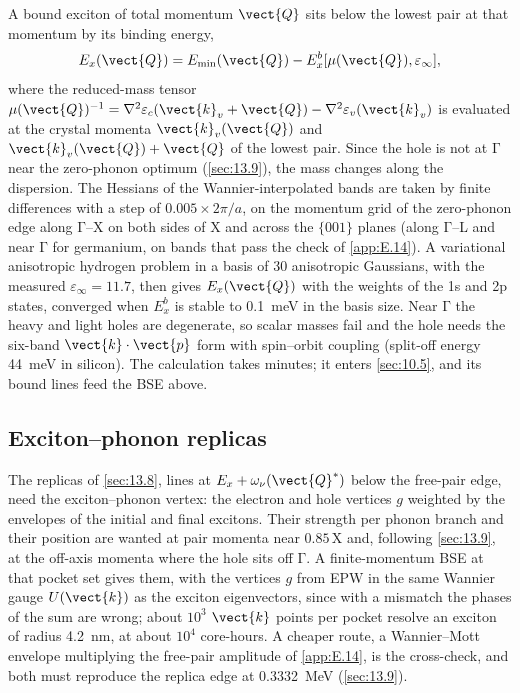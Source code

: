 A bound exciton of total momentum $\vect{Q}$ sits below the lowest pair at that momentum by its binding energy,
\begin{equation}
  E_x(\vect{Q}) = E_{\mathrm{min}}(\vect{Q}) - E_x^b[\mu(\vect{Q}),\varepsilon_\infty] ,
  \label{eq:E.15-disp}
\end{equation}
where the reduced-mass tensor $\mu(\vect{Q})^{-1} = \nabla^2\varepsilon_c(\vect{k}_v+\vect{Q}) - \nabla^2\varepsilon_v(\vect{k}_v)$ is evaluated at the crystal momenta $\vect{k}_v(\vect{Q})$ and $\vect{k}_v(\vect{Q})+\vect{Q}$ of the lowest pair. Since the hole is not at $\mathrm{\Gamma}$ near the zero-phonon optimum (\cref{sec:13.9}), the mass changes along the dispersion. The Hessians of the Wannier-interpolated bands are taken by finite differences with a step of $0.005\times2\pi/a$, on the momentum grid of the zero-phonon edge along $\mathrm{\Gamma}$--X on both sides of X and across the $\{001\}$ planes (along $\mathrm{\Gamma}$--L and near $\mathrm{\Gamma}$ for germanium, on bands that pass the check of \cref{app:E.14}). A variational anisotropic hydrogen problem in a basis of 30 anisotropic Gaussians, with the measured $\varepsilon_\infty = 11.7$, then gives $E_x(\vect{Q})$ with the weights of the 1s and 2p states, converged when $E_x^b$ is stable to \SI{0.1}{meV} in the basis size. Near $\mathrm{\Gamma}$ the heavy and light holes are degenerate, so scalar masses fail and the hole needs the six-band $\vect{k}\cdot\vect{p}$ form with spin--orbit coupling (split-off energy \SI{44}{meV} in silicon). The calculation takes minutes; it enters \cref{sec:10.5}, and its bound lines feed the BSE above.

\subsection{Exciton--phonon replicas}

The replicas of \cref{sec:13.8}, lines at $E_x + \omega_\nu(\vect{Q}^*)$ below the free-pair edge, need the exciton--phonon vertex: the electron and hole vertices $g$ weighted by the envelopes of the initial and final excitons. Their strength per phonon branch and their position are wanted at pair momenta near $0.85\,\mathrm{X}$ and, following \cref{sec:13.9}, at the off-axis momenta where the hole sits off $\mathrm{\Gamma}$. A finite-momentum BSE at that pocket set gives them, with the vertices $g$ from EPW in the same Wannier gauge $U(\vect{k})$ as the exciton eigenvectors, since with a mismatch the phases of the sum are wrong; about $10^3$ $\vect{k}$ points per pocket resolve an exciton of radius \SI{4.2}{nm}, at about $10^4$ core-hours. A cheaper route, a Wannier--Mott envelope multiplying the free-pair amplitude of \cref{app:E.14}, is the cross-check, and both must reproduce the replica edge at \SI{0.3332}{MeV} (\cref{sec:13.9}).

